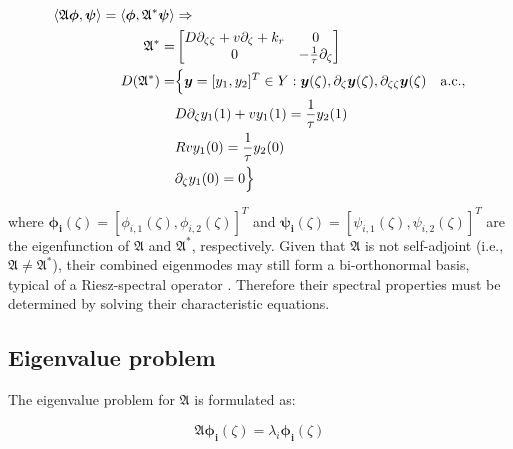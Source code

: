 \begin{equation} \label{eq:adjoint_A}
    \begin{aligned}
        \langle \mathfrak{A} \bm{\phi}, \bm{\psi}\rangle  = \langle \bm{\phi}, {\mathfrak{A}}^{*} \bm{\psi}\rangle  &\Rightarrow \\
        {\mathfrak{A}}^{*} =&
        \begin{bmatrix}
            D \partial_{\zeta \zeta} + v \partial_\zeta +k_r & 0\\
            0 & -\frac{1}{\tau} \partial_\zeta
        \end{bmatrix}\\
        D(\mathfrak{A}^*) =& \Bigl\{ \bm{y} = [y_1, y_2]^T \in Y:
        \bm{y}(\zeta), \partial_\zeta \bm{y}(\zeta), \partial_{\zeta \zeta} \bm{y}(\zeta) \quad \mathrm{a.c.},\\
        &D \partial_\zeta y_1(1) + v y_1(1) = \frac{1}{\tau} y_2(1) \\
        &R v y_1(0) = \frac{1}{\tau} y_2(0) \\
        &\partial_\zeta y_1(0) = 0 \Bigr\}
    \end{aligned}
\end{equation}

where $\bm{\phi_i}(\zeta) = [\phi_{i,1}(\zeta), \phi_{i,2}(\zeta)]^T$ and $\bm{\psi_i}(\zeta) = [\psi_{i,1}(\zeta), \psi_{i,2}(\zeta)]^T$ are the eigenfunction of $\mathfrak{A}$ and $\mathfrak{A}^*$, respectively. Given that $\mathfrak{A}$ is not self-adjoint (i.e., $\mathfrak{A} \neq \mathfrak{A}^*$), their combined eigenmodes may still form a bi-orthonormal basis, typical of a Riesz-spectral operator \autocite{curtainbook}. Therefore their spectral properties must be determined by solving their characteristic equations.

\subsection{Eigenvalue problem}

The eigenvalue problem for $\mathfrak{A}$ is formulated as:

\begin{equation} \label{eq:eig_prob}
        \mathfrak{A} \bm{\phi_i}(\zeta) = \lambda_i \bm{\phi_i}(\zeta)
\end{equation}

